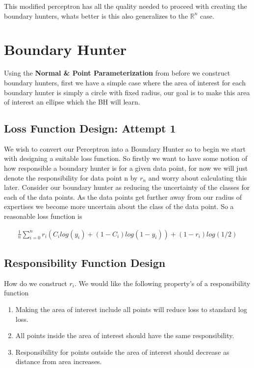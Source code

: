 \documentclass{article}
\begin{document}
This modified perceptron has all the quality needed to proceed with creating the boundary hunters, whats better is this also generalizes to the $\mathbb{R}^n$ case.

\section{Boundary Hunter}
Using the \textbf{Normal \& Point Parameterization} from before we construct boundary hunters, first we have a simple case where the area of interest for each boundary hunter is simply a circle with fixed radius, our goal is to make this area of interest an ellipse which the BH will learn.

\subsection{Loss Function Design: Attempt 1}
We wish to convert our Perceptron into a Boundary Hunter so to begin we start with designing a suitable loss function. So firstly we want to have some notion of how responsible a boundary hunter is for a given data point, for now we will just denote the responsibility for data point n by $r_n$ and worry about calculating this later. Consider our boundary hunter as reducing the uncertainty of the classes for each of the data points. As the data points get further away from our radius of expertises we become more uncertain about the class of the data point. So a reasonable loss function is 

\begin{align}
\frac{1}{n} \sum_{i=0}^n r_i(C_i log(y_i) + (1-C_i)log(1-y_i)) + (1-r_i) log(1/2)
\end{align}


\subsection{Responsibility Function Design}
How do we construct $r_i$. We would like the following property's of a responsibility function

\begin{enumerate}
\item Making the area of interest include all points will reduce loss to standard log loss.
\item All points inside the area of interest should have the same responsibility.
\item Responsibility for points outside the area of interest should decrease as distance from area increases.
\end{enumerate}
\end{document}

